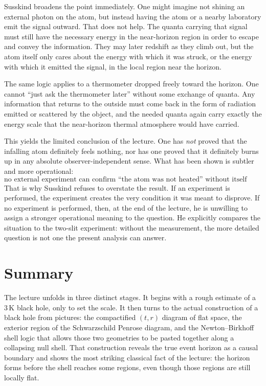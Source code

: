 Susskind broadens the point immediately. One might imagine not shining an external photon on the atom, but instead having the atom or a nearby laboratory emit the signal outward. That does not help. The quanta carrying that signal must still have the necessary energy in the near-horizon region in order to escape and convey the information. They may later redshift as they climb out, but the atom itself only cares about the energy with which it was struck, or the energy with which it emitted the signal, in the local region near the horizon.

The same logic applies to a thermometer dropped freely toward the horizon. One cannot ``just ask the thermometer later'' without some exchange of quanta. Any information that returns to the outside must come back in the form of radiation emitted or scattered by the object, and the needed quanta again carry exactly the energy scale that the near-horizon thermal atmosphere would have carried.

This yields the limited conclusion of the lecture. One has \emph{not} proved that the infalling atom definitely feels nothing, nor has one proved that it definitely burns up in any absolute observer-independent sense. What has been shown is subtler and more operational:
\begin{equation}
\text{no external experiment can confirm ``the atom was not heated'' without itself causing heating or ionization.}
\end{equation}
That is why Susskind refuses to overstate the result. If an experiment is performed, the experiment creates the very condition it was meant to disprove. If no experiment is performed, then, at the end of the lecture, he is unwilling to assign a stronger operational meaning to the question. He explicitly compares the situation to the two-slit experiment: without the measurement, the more detailed question is not one the present analysis can answer.

\section{Summary}

The lecture unfolds in three distinct stages. It begins with a rough estimate of a \(3\,\mathrm{K}\) black hole, only to set the scale. It then turns to the actual construction of a black hole from pictures: the compactified \((t,r)\) diagram of flat space, the exterior region of the Schwarzschild Penrose diagram, and the Newton--Birkhoff shell logic that allows those two geometries to be pasted together along a collapsing null shell. That construction reveals the true event horizon as a causal boundary and shows the most striking classical fact of the lecture: the horizon forms before the shell reaches some regions, even though those regions are still locally flat.

